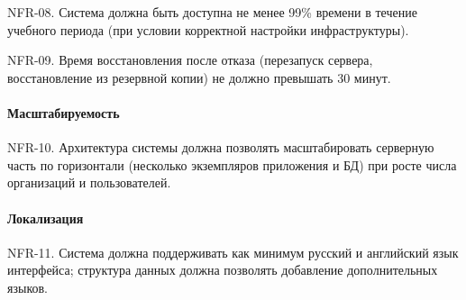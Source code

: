 \documentclass{G7-32}
\begin{document}
NFR-08. Система должна быть доступна не менее 99\% времени в течение учебного периода (при условии корректной настройки инфраструктуры).  

NFR-09. Время восстановления после отказа (перезапуск сервера, восстановление из резервной копии) не должно превышать 30 минут.

\paragraph{Масштабируемость}

NFR-10. Архитектура системы должна позволять масштабировать серверную часть по горизонтали (несколько экземпляров приложения и БД) при росте числа организаций и пользователей.

\paragraph{Локализация}

NFR-11. Система должна поддерживать как минимум русский и английский язык интерфейса; структура данных должна позволять добавление дополнительных языков.
\end{document}
